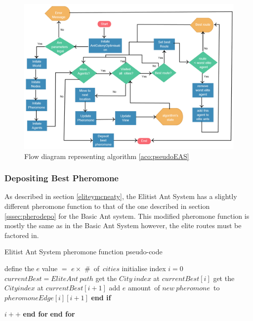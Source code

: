 \clearpage
\begin{figure}
\includegraphics[scale=0.38]{Images/chapter4/eliteAntFlow}
\caption[Elitist Ant System Flow Diagram]{Flow diagram representing algorithm \ref{aco:pseudoEAS}}
\label{fig:overallFlowEAS}
\end{figure}
\clearpage

\subsubsection{Depositing Best Pheromone}

As described in section \ref{eliteymcneaty}, the Elitist Ant System has a slightly different pheromone function to that of the one described in section \ref{sssec:pherodepo} for the Basic Ant system. This modified pheromone function is mostly the same as in the Basic Ant System however, the elite routes must be factored in.

\begin{algorithm}[H]
\caption[Elite Ant System Pseudo-code Pheromone Function]{Elitist Ant System pheromone function pseudo-code}
\label{aco:pseudoEASphero}
\begin{algorithmic}[1]

\State define the $e$ value $=$ $e \times $ \#\ of\ $cities$
\State initialise index $i = 0$
\State $currentBest = EliteAnt\ path$ 
\State get the $City\ index$ at $currentBest[i]$
\State get the $City index$ at $currentBest[i + 1]$
\State add $e$ amount\ of $new\ pheromone$\ to\ $pheromoneEdge[i][i + 1]$
\EndIf 
\State \textbf{end if}

\State $i++$
\EndFor 
\State \textbf{end for}
\EndFor
\State \textbf{end for}

\end{algorithmic}
\end{algorithm}


